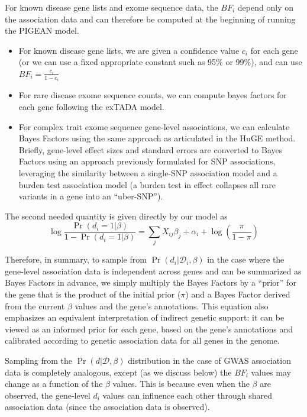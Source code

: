 \documentclass[11pt]{article}
\begin{document}
For known disease gene lists and exome sequence data, the $BF_i$
depend only on the association data and can therefore be computed at
the beginning of running the PIGEAN model.
\begin{itemize}
\item For known disease gene lists, we are given a confidence value
  $c_i$ for each gene (or we can use a fixed appropriate constant such as
  95\% or 99\%), and can use $BF_i = \frac{c_i}{1-c_i}$
\item For rare disease exome sequence counts, we can compute bayes
  factors for each gene following the exTADA model\cite{}.
\item For complex trait exome sequence gene-level associations, we
    can calculate Bayes Factors using the same approach as articulated
    in the HuGE method\cite{}. Briefly, gene-level effect sizes and
    standard errors are converted to Bayes Factors using an approach
    previously formulated for SNP associations, leveraging the
    similarity between a single-SNP association model and a burden
    test association model (a burden test in effect collapses all rare
    variants in a gene into an ``uber-SNP'').
\end{itemize}

The second needed quantity is given directly by our model as
\begin{equation}\log{\frac{\Pr\left(d_i=1|\beta\right)}{1-\Pr\left(d_i=1|\beta\right)}} = \sum_jX_{ij}\beta_j + \alpha_i +
\log\left(\frac{\pi}{1-\pi}\right)\label{eq:prior}
\end{equation}

Therefore, in summary, to sample from
$\Pr\left(d_i|\mathcal{D}_i,\beta\right)$ in the case where the
gene-level association data is independent across genes and can be
summarized as Bayes Factors in advance, we simply multiply the Bayes
Factors by a ``prior'' for the gene that is the product of the initial
prior ($\pi$) and a Bayes Factor derived from the current $\beta$
values and the gene's annotations. This equation also emphasizes an
equivalent interpretation of indirect genetic support: it can be
viewed as an informed prior for each gene, based on the gene's
annotations and calibrated according to genetic association data for
all genes in the genome.

Sampling from the
$\Pr\left(d|\mathcal{D},\beta\right)$ distribution
in the case of GWAS association data is completely analogous, except
(as we discuss below) the $BF_i$ values may change as a function of
the $\beta$ values. This is because even when the $\beta$ are
observed, the gene-level $d_i$ values can influence each other through
shared association data (since the association data is observed).
\end{document}
